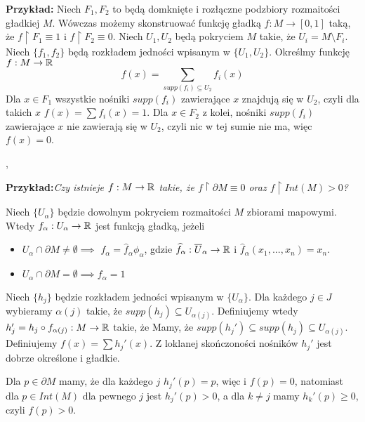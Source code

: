 \textbf{Przykład:} Niech $F_1,F_2$ to będą domknięte i rozłączne podzbiory rozmaitości gładkiej $M$. Wówczas możemy skonstruować funkcję gładką $f:M\to[0,1]$ taką, że $f\restriction F_1\equiv 1$ i $f\restriction F_2\equiv 0$. Niech $U_1,U_2$ będą pokryciem $M$ takie, że $U_i=M\setminus F_i$. Niech $\{f_1,f_2\}$ będą rozkładem jedności wpisanym w $\{U_1,U_2\}$. Określmy funkcję $f:M\to\mathbb{R}$
$$f(x)=\sum\limits_{supp(f_i)\subseteq U_2}f_i(x)$$
Dla $x\in F_1$ wszystkie nośniki $supp(f_i)$ zawierające $x$ znajdują się w $U_2$, czyli dla takich $x$ $f(x)=\sum f_i(x)=1$. Dla $x\in F_2$ z kolei, nośniki $supp(f_i)$ zawierające $x$ nie zawierają się w $U_2$, czyli nic w tej sumie nie ma, więc $f(x)=0$.
\medskip

\sep
\medskip

\textbf{Przykład:}\emph{Czy istnieje $f:M\to\mathbb{R}$ takie, że $f\restriction\partial M\equiv 0$ oraz $f\restriction Int(M)>0$?}

Niech $\{U_\alpha\}$ będzie dowolnym pokryciem rozmaitości $M$ zbiorami mapowymi. Wtedy $f_\alpha:U_\alpha\to\mathbb{R}$ jest funkcją gładką, jeżeli
\begin{itemize}
    \item $U_\alpha\cap\partial M\neq\emptyset\implies$ $f_\alpha=\hat{f}_\alpha\phi_\alpha$, gdzie $\widehat{f}_\alpha:\overline U_\alpha\to \mathbb{R}$ i $\hat{f}_\alpha(x_1,...,x_n)=x_n$.
    \item $U_\alpha\cap\partial M=\emptyset\implies f_\alpha=1$
\end{itemize}
Niech $\{h_j\}$ będzie rozkładem jedności wpisanym w $\{U_\alpha\}$. Dla każdego $j\in J$ wybieramy $\alpha(j)$ takie, że $supp(h_j)\subseteq U_{\alpha(j)}$. Definiujemy wtedy $h_j'=h_j\circ f_{\alpha(j)}:M\to\mathbb{R}$ takie, że
Mamy, że $supp(h_j')\subseteq supp(h_j)\subseteq U_{\alpha(j)}$.
Definiujemy $f(x)=\sum h_j'(x)$.
Z loklanej skończoności nośników $h_j'$ jest dobrze określone i gładkie. 

Dla $p\in\partial M$ mamy, że dla każdego $j$ $h_j'(p)=p$, więc i $f(p)=0$, natomiast dla $p\in Int(M)$ dla pewnego $j$ jest $h_j'(p)>0$, a dla $k\neq j$ mamy $h_k'(p)\geq0$, czyli $f(p)>0$.





